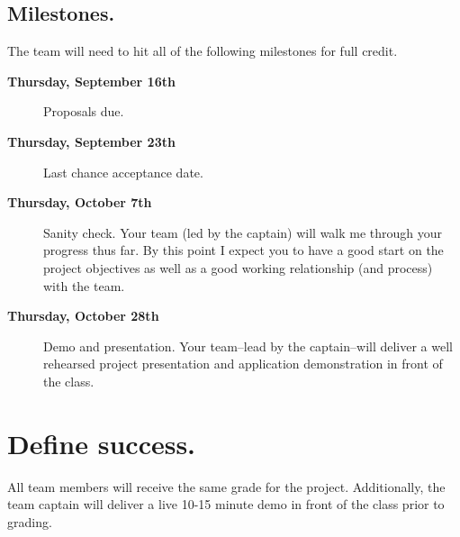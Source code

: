 \documentclass[12pt]{article}
\begin{document}
\underline{\phantom{\hspace{5in}}}

\underline{\phantom{\hspace{5in}}}

\underline{\phantom{\hspace{5in}}}

\underline{\phantom{\hspace{5in}}}

\underline{\phantom{\hspace{5in}}}

\underline{\phantom{\hspace{5in}}}

\underline{\phantom{\hspace{5in}}}

\underline{\phantom{\hspace{5in}}}

\underline{\phantom{\hspace{5in}}}

\subsection{Milestones.}
The team will need to hit all of the following milestones for full credit.

\begin{description}
\item[\bf Thursday, September 16th] Proposals due. 
\item[\bf Thursday, September 23th] Last chance acceptance date. 
\item[\bf Thursday, October 7th] Sanity check. Your team (led by the captain) will walk me through your progress thus far. By this point I expect you to have a good start on the project objectives as well as a good working relationship (and process) with the team.
\item[\bf Thursday, October 28th] Demo and presentation. Your team--lead by the captain--will deliver a well rehearsed project presentation and application demonstration in front of the class.
\end{description}


\pagebreak

\section{Define success.}
All team members will receive the same grade for the project. Additionally, the team captain will deliver a live 10-15 minute demo in front of the class prior to grading.
\end{document}
